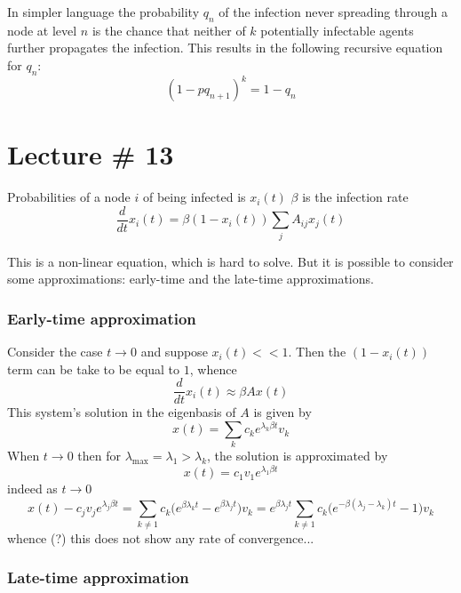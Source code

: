 \documentclass[a4paper]{article}
\begin{document}
In simpler language the probability $q_n$ of the infection never spreading
through a node at level $n$ is the chance that neither of $k$ potentially
infectable agents further propagates the infection. This results in the
following recursive equation for $q_n$:
\[(1-pq_{n+1})^k = 1-q_n\]





\section{Lecture \# 13} %
\label{sec:lecture_13}


Probabilities of a node $i$ of being infected is $x_i(t)$
$\beta$ is the infection rate 
\[\frac{d}{dt} x_i(t) = \beta (1-x_i(t)) \sum_j A_{ij} x_j(t)\]

This is a non-linear equation, which is hard to solve. But it is possible to
consider some approximations: early-time and the late-time approximations.

\subsubsection{Early-time approximation} %
\label{ssub:early_time_approximation}

Consider the case $t\to 0$ and suppose $x_i(t) << 1$. Then the $(1-x_i(t))$ term
can be take to be equal to $1$, whence
\[\frac{d}{dt} x_i(t) \approx \beta A x(t)\]
This system's solution in the eigenbasis of $A$ is given by
\[x(t) = \sum_k c_k e^{\lambda_k \beta t} v_k\]
When $t\to 0$ then for $\lambda_\text{max} = \lambda_1> \lambda_k$, the solution
is approximated by
\[x(t) = c_1 v_1 e^{\lambda_1 \beta t}\]
indeed as $t\to 0$
\[
x(t) - c_j v_j e^{\lambda_j \beta t}
= \sum_{k\neq 1} c_k \bigl(e^{\beta\lambda_k t}-e^{\beta\lambda_j t}\bigr) v_k
= e^{\beta\lambda_j t} \sum_{k\neq 1} c_k \bigl(e^{-\beta(\lambda_j-\lambda_k) t}-1\bigr) v_k
\]
whence (?) this does not show any rate of convergence...


\subsubsection{Late-time approximation} %
\label{ssub:late_time_approximation}
\end{document}
